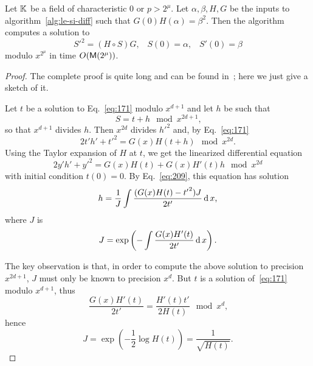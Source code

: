 \begin{theorem}
  Let $\mathbb{K}$ be a field of characteristic $0$ or $p>2^\mu$. Let
  $\alpha,\beta,H,G$ be the inputs to algorithm~\ref{alg:le-si-diff}
  such that $G(0)H(\alpha)=\beta^2$. Then the algorithm computes a
  solution to
  \begin{equation}
    \label{eq:171}
    {S'}^2 = (H\circ S)G
    \text{,}\quad
    S(0) = \alpha
    \text{,}\quad
    S'(0) = \beta
  \end{equation}
  modulo $x^{2^\mu}$ in time $O(\mathsf{M}(2^{\mu}))$.
\end{theorem}
\begin{proof}
  The complete proof is quite long and can be found
  in~\cite{lercier+sirvent08}; here we just give a sketch of it.

  Let $t$ be a solution to Eq.~\eqref{eq:171} modulo $x^{d+1}$ and let
  $h$ be such that 
  \begin{equation}
    \label{eq:175}
    S = t + h \mod x^{2d+1}
    \text{,}
  \end{equation}
  so that $x^{d+1}$ divides $h$.  Then $x^{2d}$ divides ${h'}^2$ and,
  by Eq.~\eqref{eq:171}
  \begin{equation}
    \label{eq:176}
    2t'h' + {t'}^2 = G(x)H(t+h) \mod x^{2d}
    \text{.}
  \end{equation}
  Using the Taylor expansion of $H$ at $t$, we get the linearized
  differential equation
  \begin{equation}
    \label{eq:177}
    2y'h' + {y'}^2 = G(x)H(t) + G(x)H'(t)h
    \mod x^{2d}
  \end{equation}
  with initial condition $t(0)=0$. By Eq.~\eqref{eq:209}, this
  equation has solution
  \begin{equation}
    \label{eq:178}
    h = \frac{1}{J} \int \frac{(G(x)H(t) - {t'}^2)J}{2t'}\operatorname{d} x
    \text{,}
  \end{equation}
  where $J$ is 
  \begin{equation}
    \label{eq:179}
    J=\exp\left(-\int\frac{G(x)H'(t)}{2t'}\operatorname{d} x\right)
    \text{.}
  \end{equation}

  The key observation is that, in order to compute the above solution
  to precision $x^{2d+1}$, $J$ must only be known to precision
  $x^d$. But $t$ is a solution of~\eqref{eq:171} modulo $x^{d+1}$, thus 
  \begin{equation}
    \label{eq:172}
    \frac{G(x)H'(t)}{2t'} = \frac{H'(t)t'}{2H(t)} \mod x^d
    \text{,}
  \end{equation}
  hence
  \begin{equation}
    \label{eq:173}
    J = \exp\left(-\frac{1}{2}\log H(t)\right) = \frac{1}{\sqrt{H(t)}}
    \text{.}
  \end{equation}


\end{proof}
